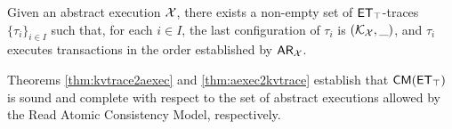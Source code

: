 

\begin{theorem}
\label{thm:aexec2kvtrace}
Given an abstract execution $\mathcal{X}$, there exists a non-empty 
set of $\mathsf{ET}_{\top}$-traces $\{\tau_{i}\}_{i \in I}$ such that, for each $i \in I$, the last configuration of $\tau_{i}$ is 
$(\mathcal{K}_{\mathcal{X}}, \_)$, and $\tau_{i}$ executes transactions in the order established by $\mathsf{AR}_{\mathcal{X}}$. 
\end{theorem}
\noindent Theorems \ref{thm:kvtrace2aexec} and \ref{thm:aexec2kvtrace} establish that $\CMs(\ET_{\top})$ is 
sound and complete with respect to the set of abstract executions allowed by the Read Atomic Consistency Model, 
respectively. 

